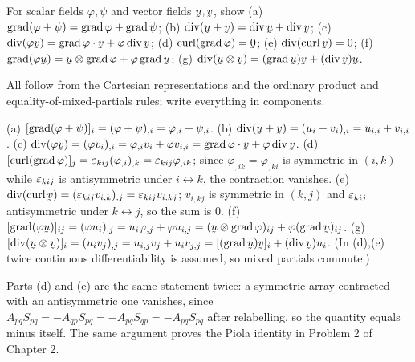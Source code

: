 \begin{problem}
For scalar fields $\varphi,\psi$ and vector fields $\bu,\bv$, show
(a) $\operatorname{grad}(\varphi+\psi)=\operatorname{grad}\varphi+\operatorname{grad}\psi$;
(b) $\dvg(\bu+\bv)=\dvg\bu+\dvg\bv$;
(c) $\dvg(\varphi\bv)=\ip{\grad\varphi}\bv+\varphi\dvg\bv$;
(d) $\crl(\grad\varphi)=\bze$;
(e) $\dvg(\crl\bv)=0$;
(f) $\grad(\varphi\bu)=\bu\otimes\grad\varphi+\varphi\grad\bu$;
(g) $\dvg(\bu\otimes\bv)=(\grad\bu)\bv+(\dvg\bv)\bu$.
\end{problem}
\begin{solution}
All follow from the Cartesian representations and the ordinary product and
equality-of-mixed-partials rules; write everything in components.

(a) $[\operatorname{grad}(\varphi+\psi)]_i=(\varphi+\psi)_{,i}=\varphi_{,i}+\psi_{,i}$.
(b) $\dvg(\bu+\bv)=(u_i+v_i)_{,i}=u_{i,i}+v_{i,i}$.
(c) $\dvg(\varphi\bv)=(\varphi v_i)_{,i}=\varphi_{,i}v_i+\varphi v_{i,i}
=\ip{\grad\varphi}\bv+\varphi\dvg\bv$.
(d) $[\operatorname{curl}(\operatorname{grad}\varphi)]_j=\varepsilon_{kij}(\varphi_{,i})_{,k}
=\varepsilon_{kij}\varphi_{,ik}$; since $\varphi_{,ik}=\varphi_{,ki}$ is symmetric
in $(i,k)$ while $\varepsilon_{kij}$ is antisymmetric under $i\leftrightarrow k$,
the contraction vanishes.
(e) $\dvg(\crl\bv)=(\eps_{kij}v_{i,k})_{,j}=\eps_{kij}v_{i,kj}$; $v_{i,kj}$
is symmetric in $(k,j)$ and $\varepsilon_{kij}$ antisymmetric under
$k\leftrightarrow j$, so the sum is $0$.
(f) $[\grad(\varphi\bu)]_{ij}=(\varphi u_i)_{,j}=u_i\varphi_{,j}
+\varphi u_{i,j}=(\bu\otimes\grad\varphi)_{ij}+\varphi(\grad\bu)_{ij}$.
(g) $[\dvg(\bu\otimes\bv)]_i=(u_iv_j)_{,j}=u_{i,j}v_j+u_iv_{j,j}
=[(\grad\bu)\bv]_i+(\dvg\bv)u_i$.
(In (d),(e) twice continuous differentiability is assumed, so mixed
partials commute.)

Parts (d) and (e) are the same statement twice: a symmetric array
contracted with an antisymmetric one vanishes, since
$A_{pq}S_{pq}=-A_{qp}S_{pq}=-A_{pq}S_{qp}=-A_{pq}S_{pq}$ after relabelling,
so the quantity equals minus itself. The same argument proves the Piola
identity in Problem 2 of Chapter 2.
\end{solution}

